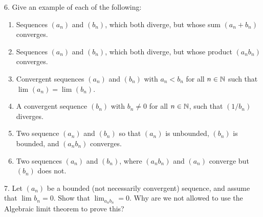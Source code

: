 6. Give an example of each of the following:
\begin{enumerate}
	\item Sequences $\left( a_n \right)$ and $ \left( b_n \right) $, which both diverge, but whose sum $\left( a_n + b_n \right) $ converges.
	\item Sequences $\left( a_n \right) $ and $\left( b_n \right)$, which both diverge, but whose product $\left( a_n b_n \right) $ converges.
	\item Convergent sequences $\left( a_n \right) $ and $\left( b_n \right) $ with $a_n < b_n$ for all $n \in \mathbb{N}$ such that $\lim_{} \left( a_n \right) = \lim_{} \left( b_n \right) $.
	\item A convergent sequence $\left( b_n \right) $ with $b_n \neq 0$ for all $n \in \mathbb{N}$, such that $\left( 1 / b_n \right)$ diverges.
	\item Two sequence $\left( a_n \right) $ and $\left( b_n \right) $ so that $\left( a_n \right) $ is unbounded, $\left( b_n \right) $ is bounded, and $\left( a_nb_n \right)$ converges.
	\item Two sequences $\left( a_n \right)$ and $ \left( b_n \right) $, where $\left( a_n b_n \right) $ and $\left( a_n \right) $ converge but $\left( b_n \right) $ does not.
\end{enumerate}

7. Let $\left( a_n \right) $ be a bounded (not necessarily convergent) sequence, and assume that $\lim_{} b_n = 0$. Show that $\lim_{a_n b_n} = 0$. Why are we not allowed to use the Algebraic limit theorem to prove this?









